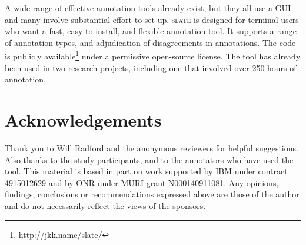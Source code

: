 \documentclass[11pt,a4paper]{article}
\newcommand\slate{\textsc{slate}\xspace}
\begin{document}
A wide range of effective annotation tools already exist, but they all use a GUI and many involve substantial effort to set up.
\slate is designed for terminal-users who want a fast, easy to install, and flexible annotation tool.
It supports a range of annotation types, and adjudication of disagreements in annotations.
The code is publicly available\footnote{\url{http://jkk.name/slate/}} under a permissive open-source license.
The tool has already been used in two research projects, including one that involved over 250 hours of annotation.

\section*{Acknowledgements}

Thank you to Will Radford and the anonymous reviewers for helpful suggestions.
Also thanks to the study participants, and to the annotators who have used the tool.
This material is based in part on work supported by IBM under contract 4915012629 and by ONR under MURI grant N000140911081.
Any opinions, findings, conclusions or recommendations expressed above are those of the author and do not necessarily reflect the views of the sponsors.



\end{document}
